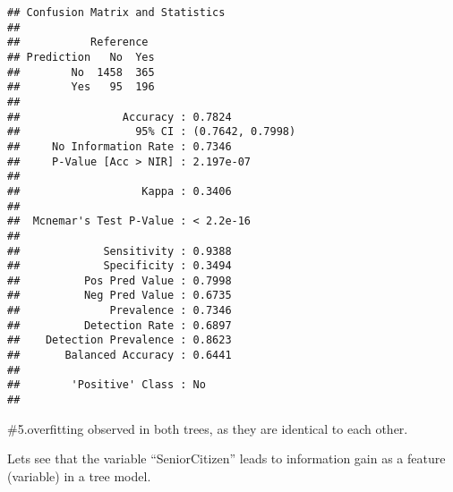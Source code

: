\documentclass[
]{article}
\begin{document}
\begin{verbatim}
## Confusion Matrix and Statistics
## 
##           Reference
## Prediction   No  Yes
##        No  1458  365
##        Yes   95  196
##                                           
##                Accuracy : 0.7824          
##                  95% CI : (0.7642, 0.7998)
##     No Information Rate : 0.7346          
##     P-Value [Acc > NIR] : 2.197e-07       
##                                           
##                   Kappa : 0.3406          
##                                           
##  Mcnemar's Test P-Value : < 2.2e-16       
##                                           
##             Sensitivity : 0.9388          
##             Specificity : 0.3494          
##          Pos Pred Value : 0.7998          
##          Neg Pred Value : 0.6735          
##              Prevalence : 0.7346          
##          Detection Rate : 0.6897          
##    Detection Prevalence : 0.8623          
##       Balanced Accuracy : 0.6441          
##                                           
##        'Positive' Class : No              
## 
\end{verbatim}

\#5.overfitting observed in both trees, as they are identical to each
other.

Lets see that the variable ``SeniorCitizen'' leads to information gain
as a feature (variable) in a tree model.
\end{document}
